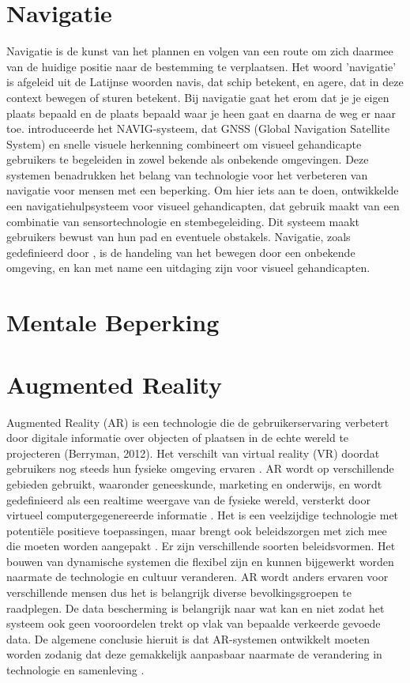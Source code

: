 \section{Navigatie}
\label{sec:navigatie}
Navigatie is de kunst van het plannen en volgen van een route om zich daarmee van de huidige positie naar de bestemming te verplaatsen. Het woord 'navigatie' is afgeleid uit de Latijnse woorden navis, dat schip betekent, en agere, dat in deze context bewegen of sturen betekent. Bij navigatie gaat het erom dat je je eigen plaats bepaald en de plaats bepaald waar je heen gaat en daarna de weg er naar toe. \textcite{Katz2010} introduceerde het NAVIG-systeem, dat GNSS (Global Navigation Satellite System) en snelle visuele herkenning combineert om visueel gehandicapte gebruikers te begeleiden in zowel bekende als onbekende omgevingen. Deze systemen benadrukken het belang van technologie voor het verbeteren van navigatie voor mensen met een beperking. Om hier iets aan te doen, ontwikkelde \textcite{Lakde2015} een navigatiehulpsysteem voor visueel gehandicapten, dat gebruik maakt van een combinatie van sensortechnologie en stembegeleiding. Dit systeem maakt gebruikers bewust van hun pad en eventuele obstakels. Navigatie, zoals gedefinieerd door \textcite{Gachet2010}, is de handeling van het bewegen door een onbekende omgeving, en kan met name een uitdaging zijn voor visueel gehandicapten.
\section{Mentale Beperking}
\label{sec:mentale beperking}
\section{Augmented Reality}
\label{sec:augmented reality}
Augmented Reality (AR) is een technologie die de gebruikerservaring verbetert door digitale informatie over objecten of plaatsen in de echte wereld te projecteren (Berryman, 2012). Het verschilt van virtual reality (VR) doordat gebruikers nog steeds hun fysieke omgeving ervaren \autocite{Calo2015}. AR wordt op verschillende gebieden gebruikt, waaronder geneeskunde, marketing en onderwijs, en wordt gedefinieerd als een realtime weergave van de fysieke wereld, versterkt door virtueel computergegenereerde informatie \autocite{Carmigniani2011}. Het is een veelzijdige technologie met potentiële positieve toepassingen, maar brengt ook beleidszorgen met zich mee die moeten worden aangepakt \autocite{Calo2015}. Er zijn verschillende soorten beleidsvormen. Het bouwen van dynamische systemen die flexibel zijn en kunnen bijgewerkt worden naarmate de technologie en cultuur veranderen. AR wordt anders ervaren voor verschillende mensen dus het is belangrijk diverse bevolkingsgroepen te raadplegen. De data bescherming is belangrijk naar wat kan en niet zodat het systeem ook geen vooroordelen trekt op vlak van bepaalde verkeerde gevoede data. De algemene conclusie hieruit is dat AR-systemen ontwikkelt moeten worden zodanig dat deze gemakkelijk aanpasbaar naarmate de verandering in technologie en samenleving \autocite{Calo2015}.
